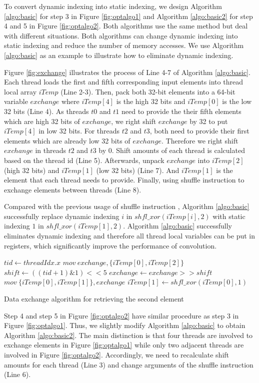 To convert dynamic indexing into static indexing, we design Algorithm \ref{algo:basic} for step 3 in Figure \ref{fig:optalgo1} and
Algorithm \ref{algo:basic2} for step 4 and 5 in Figure \ref{fig:optalgo2}. Both algorithms use the same method but deal with different
situations. Both algorithms can change dynamic indexing into static indexing and reduce the number of memory accesses. We use Algorithm
\ref{algo:basic} as an example to illustrate how to eliminate dynamic indexing.

Figure \ref{fig:exchange} illustrates the process of Line 4-7 of Algorithm \ref{algo:basic}. Each thread loads the first and fifth
corresponding input elements into thread local array $iTemp$ (Line 2-3). Then, pack both 32-bit elements into a 64-bit variable $exchange$
where $iTemp[4]$ is the high 32 bits and $iTemp[0]$ is the low 32 bits (Line 4). As threads $t0$ and $t1$ need to provide the their fifth
elements which are high 32 bits of $exchange$, we right shift $exchange$ by 32 to put $iTemp[4]$ in low 32 bits. For threads $t2$ and $t3$,
both need to provide their first elements which are already low 32 bits of $exchange$. Therefore we right shift $exchange$ in threads $t2$
and $t3$ by 0. Shift amounts of each thread is calculated based on the thread id (Line 5). Afterwards, unpack $exchange$ into $iTemp[2]$
(high 32 bits) and $iTemp[1]$ (low 32 bits) (Line 7). And $iTemp[1]$ is the element that each thread needs to provide. Finally, using
shuffle instruction to exchange elements between threads (Line 8).

Compared with the previous usage of shuffle instruction \cite{vasilache2014fast}, Algorithm \ref{algo:basic} successfully replace dynamic
indexing $i$ in $shfl\_xor(iTemp[i],2)$ with static indexing $1$ in $shfl\_xor(iTemp[1],2)$. Algorithm \ref{algo:basic} successfully
eliminates dynamic indexing and therefore all thread local variables can be put in registers, which significantly improve the performance
of convolution.

\begin{algorithm}
	$tid \gets threadIdx.x$\;
	$mov\ exchange, \{iTemp[0], iTemp[2]\}$\;
	$shift \gets ((tid+1)\&1)<<5$\;
	$exchange \gets exchange >> shift$\;
	$mov\ \{iTemp[0],iTemp[1]\}, exchange$\;
	$iTemp[1] \gets shfl\_xor(iTemp[0],1)$\;	
	\caption{Data exchange algorithm for retrieving the second element}
	\label{algo:basic2}
\end{algorithm}

Step 4 and step 5 in Figure \ref{fig:optalgo2} have similar procedure as step 3 in Figure \ref{fig:optalgo1}. Thus, we slightly modify
Algorithm \ref{algo:basic} to obtain Algorithm \ref{algo:basic2}. The main distinction is that four threads are involved to exchange
elements in Figure \ref{fig:optalgo1} while only two adjacent threads are involved in Figure \ref{fig:optalgo2}. Accordingly, we need to
recalculate shift amounts for each thread (Line 3) and change arguments of the shuffle instruction (Line 6).

